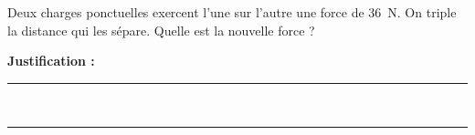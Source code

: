 Deux charges ponctuelles exercent l'une sur l'autre une force de \qty{36}{N}. On triple la distance qui les sépare. Quelle est la nouvelle force ?

\choices

\noindent\textbf{Justification :} \hrulefill \\[2.5ex]
\rule{\linewidth}{0.4pt} \\[2.5ex]
\rule{\linewidth}{0.4pt}
\vfill
